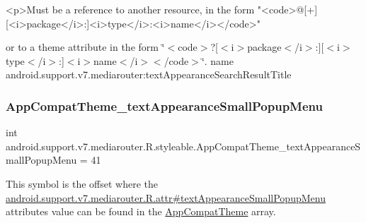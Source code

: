 \begin{DoxyVerb}      <p>Must be a reference to another resource, in the form "<code>@[+][<i>package</i>:]<i>type</i>:<i>name</i></code>"
\end{DoxyVerb}
 or to a theme attribute in the form \char`\"{}$<$code$>$?\mbox{[}$<$i$>$package$<$/i$>$\+:\mbox{]}\mbox{[}$<$i$>$type$<$/i$>$\+:\mbox{]}$<$i$>$name$<$/i$>$$<$/code$>$\char`\"{}.  name android.\+support.\+v7.\+mediarouter\+:text\+Appearance\+Search\+Result\+Title \mbox{\label{classandroid_1_1support_1_1v7_1_1mediarouter_1_1R_1_1styleable_aa0894f67d2b6095af2c79e757016f8ef}} 
\subsubsection{\texorpdfstring{App\+Compat\+Theme\+\_\+text\+Appearance\+Small\+Popup\+Menu}{AppCompatTheme\_textAppearanceSmallPopupMenu}}
{\footnotesize\ttfamily int android.\+support.\+v7.\+mediarouter.\+R.\+styleable.\+App\+Compat\+Theme\+\_\+text\+Appearance\+Small\+Popup\+Menu = 41\hspace{0.3cm}{\ttfamily [static]}}

This symbol is the offset where the \hyperlink{classandroid_1_1support_1_1v7_1_1mediarouter_1_1R_1_1attr_a437c1037939e545ae2295c73d465fbd6}{android.\+support.\+v7.\+mediarouter.\+R.\+attr\#text\+Appearance\+Small\+Popup\+Menu} attribute\textquotesingle{}s value can be found in the \hyperlink{classandroid_1_1support_1_1v7_1_1mediarouter_1_1R_1_1styleable_a4e3d3900c75d49aeb2f283cac00214d6}{App\+Compat\+Theme} array.

